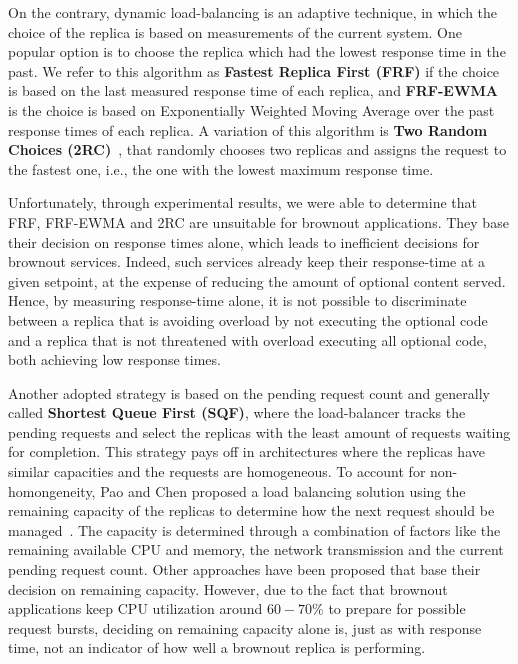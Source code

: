 On the contrary, dynamic load-balancing is an adaptive technique, in
which the choice of the replica is based on measurements of the
current system.  One popular option is to choose the replica which had
the lowest response time in the past.  We refer to this algorithm as
\textbf{Fastest Replica First (FRF)} if the choice is based on the
last measured response time of each replica, and \textbf{FRF-EWMA} is
the choice is based on Exponentially Weighted Moving Average over the
past response times of each replica.  A variation of this algorithm is
\textbf{Two Random Choices (2RC)}~\cite{2RC}, that randomly chooses
two replicas and assigns the request to the fastest one, i.e., the one
with the lowest maximum response time.

Unfortunately, through experimental results, we were able to determine
that FRF, FRF-EWMA and 2RC are unsuitable for brownout
applications. They base their decision on response times alone, which
leads to inefficient decisions for brownout services. Indeed, such
services already keep their response-time at a given setpoint, at the
expense of reducing the amount of optional content served. Hence, by
measuring response-time alone, it is not possible to discriminate
between a replica that is avoiding overload by not executing the
optional code and a replica that is not threatened with overload
executing all optional code, both achieving low response times.

Another adopted strategy is based on the pending request count and
generally called \textbf{Shortest Queue First (SQF)}, where the
load-balancer tracks the pending requests and select the replicas with the
least amount of requests waiting for completion. This strategy pays off in architectures
where the replicas have similar capacities and the requests are
homogeneous. To account for non-homongeneity, Pao and Chen proposed a
load balancing solution using the remaining capacity of the replicas
to determine how the next request should be
managed~\cite{feedbackintensive}. The capacity is determined through a
combination of factors like the remaining available CPU and memory,
the network transmission and the current pending request count.  Other
approaches have been proposed that base their decision on remaining
capacity. However, due to the fact that brownout applications keep CPU
utilization around $60-70\%$ to prepare for possible request bursts,
deciding on remaining capacity alone is, just as with response time,
not an indicator of how well a brownout replica is performing.

